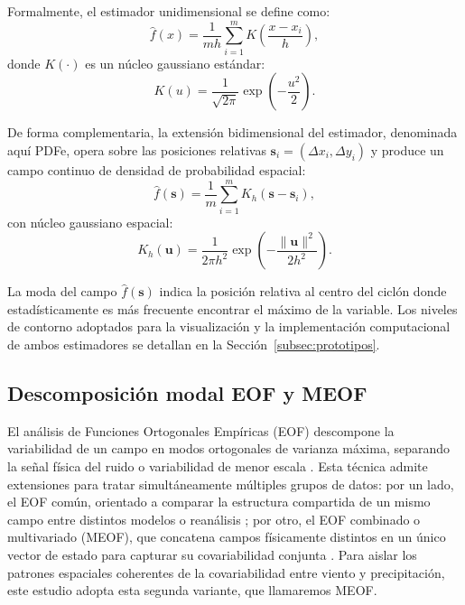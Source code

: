 Formalmente, el estimador unidimensional se define como:
\begin{equation}\label{eq:tb_kde_pdf}
\hat{f}(x) = \frac{1}{m h} \sum_{i=1}^{m} K\!\left(\frac{x - x_i}{h}\right),
\end{equation}
donde $K(\cdot)$ es un núcleo gaussiano estándar:
\begin{equation}\label{eq:tb_gaussian_kernel}
K(u) = \frac{1}{\sqrt{2\pi}} \exp\!\left(-\frac{u^2}{2}\right).
\end{equation}

De forma complementaria, la extensión bidimensional del estimador, denominada aquí PDFe, opera sobre las posiciones relativas $\mathbf{s}_i = (\Delta x_i, \Delta y_i)$ y produce un campo continuo de densidad de probabilidad espacial:
\begin{equation}\label{eq:tb_kde_simple}
\hat{f}(\mathbf{s}) = \frac{1}{m} \sum_{i=1}^{m} K_h(\mathbf{s} - \mathbf{s}_i),
\end{equation}
con núcleo gaussiano espacial:
\begin{equation}\label{eq:tb_gauss_kernel_2d_simple}
K_h(\mathbf{u}) = \frac{1}{2\pi h^2} \exp\!\left(-\frac{\|\mathbf{u}\|^2}{2h^2}\right).
\end{equation}

La moda del campo $\hat{f}(\mathbf{s})$ indica la posición relativa al centro del ciclón donde
estadísticamente es más frecuente encontrar el máximo de la variable.
Los niveles de contorno adoptados para la visualización y la implementación computacional de ambos estimadores se detallan en la Sección~\ref{subsec:prototipos}.

\subsection{Descomposición modal EOF y MEOF}\label{subsec:tb_eof}
El análisis de Funciones Ortogonales Empíricas (EOF) descompone la variabilidad de un campo en modos ortogonales de varianza máxima, separando la señal física del ruido o variabilidad de menor escala \citep{hannachi2007empirical}.
Esta técnica admite extensiones para tratar simultáneamente múltiples grupos de datos: por un lado, el EOF común, orientado a comparar la estructura compartida de un mismo campo entre distintos modelos o reanálisis \citep{hannachi2023eof}; por otro, el EOF combinado o multivariado (MEOF), que concatena campos físicamente distintos en un único vector de estado para capturar su covariabilidad conjunta \citep{liang2018multivariate}. Para aislar los patrones espaciales coherentes de la covariabilidad entre viento y precipitación, este estudio adopta esta segunda variante, que llamaremos MEOF.

